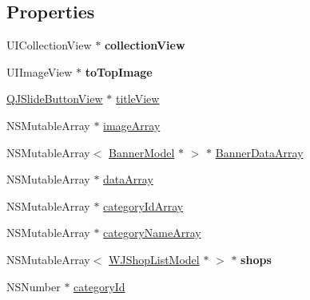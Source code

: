 \subsection*{Properties}
\begin{DoxyCompactItemize}
\item 
\mbox{\label{category_w_j_home_view_controller_07_08_a16951e3a51eef4d13e85eab0180d69a2}} 
U\+I\+Collection\+View $\ast$ {\bfseries collection\+View}
\item 
\mbox{\label{category_w_j_home_view_controller_07_08_a7c89ef8d3eb660257ae82e0bdd60f909}} 
U\+I\+Image\+View $\ast$ {\bfseries to\+Top\+Image}
\item 
\mbox{\hyperlink{interface_q_j_slide_button_view}{Q\+J\+Slide\+Button\+View}} $\ast$ \mbox{\hyperlink{category_w_j_home_view_controller_07_08_aae283e422cd06f6c7d3bef966bd9d104}{title\+View}}
\item 
N\+S\+Mutable\+Array $\ast$ \mbox{\hyperlink{category_w_j_home_view_controller_07_08_a07df5def18bfa25746e38d1b19e4495e}{image\+Array}}
\item 
N\+S\+Mutable\+Array$<$ \mbox{\hyperlink{interface_banner_model}{Banner\+Model}} $\ast$ $>$ $\ast$ \mbox{\hyperlink{category_w_j_home_view_controller_07_08_a435f4b2df4b221580e78305135623f84}{Banner\+Data\+Array}}
\item 
N\+S\+Mutable\+Array $\ast$ \mbox{\hyperlink{category_w_j_home_view_controller_07_08_affdbda6c6247401781536189b51ba10c}{data\+Array}}
\item 
N\+S\+Mutable\+Array $\ast$ \mbox{\hyperlink{category_w_j_home_view_controller_07_08_ae437f48370774174514ad698631e469e}{category\+Id\+Array}}
\item 
N\+S\+Mutable\+Array $\ast$ \mbox{\hyperlink{category_w_j_home_view_controller_07_08_a879d08089830e837fde73fe1d266e163}{category\+Name\+Array}}
\item 
\mbox{\label{category_w_j_home_view_controller_07_08_a05a16188256ff822cc7c515fce50a540}} 
N\+S\+Mutable\+Array$<$ \mbox{\hyperlink{interface_w_j_shop_list_model}{W\+J\+Shop\+List\+Model}} $\ast$ $>$ $\ast$ {\bfseries shops}
\item 
N\+S\+Number $\ast$ \mbox{\hyperlink{category_w_j_home_view_controller_07_08_a3649b27bb4dee70eba05a3ca41270480}{category\+Id}}
\item 

\end{DoxyCompactItemize}
